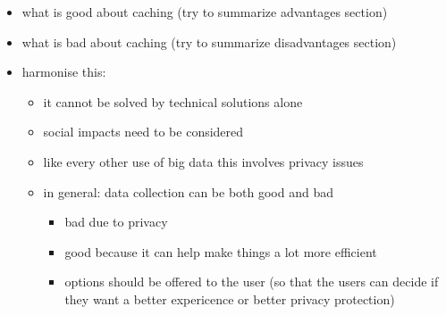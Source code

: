 
\begin{itemize}
  \item what is good about caching (try to summarize advantages section)
  \item what is bad about caching (try to summarize disadvantages section)
  \item harmonise this:
    \begin{itemize}
      \item it cannot be solved by technical solutions alone
      \item social impacts need to be considered
      \item like every other use of big data this involves privacy issues
      \item in general: data collection can be both good and bad
      \begin{itemize}
        \item bad due to privacy
        \item good because it can help make things a lot more efficient
        \item options should be offered to the user (so that the users can decide if they want a better expericence or better privacy protection)
      \end{itemize}
    \end{itemize}
\end{itemize}
